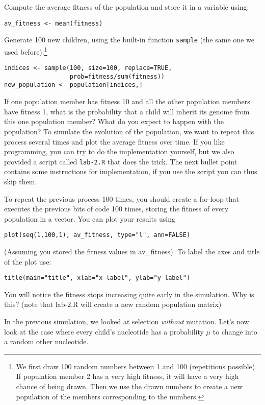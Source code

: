 \documentclass[a4paper, 9pt]{article}
\begin{document}
\begin{exercise}
    \action Compute the average fitness of the population and store it in a variable using:
\begin{lstlisting}
av_fitness <- mean(fitness)
\end{lstlisting}
    \action Generate 100 new children, using the built-in function \texttt{sample} (the same one we used before):\footnote{We first draw 100 random numbers between 1 and 100 (repetitions possible). If population member 2 has a very high fitness, it will have a very high chance of being drawn. Then we use the drawn numbers to create a new population of the members corresponding to the numbers.}
\begin{lstlisting}
indices <- sample(100, size=100, replace=TRUE, 
                  prob=fitness/sum(fitness))
new_population <- population[indices,]
\end{lstlisting}
    \askstar If one population member has fitness 10 and all the other population members have fitness 1, what is the probability that a child will inherit its genome from this one population member? What do you expect to happen with the population?
    \action To simulate the evolution of the population, we want to repeat this process several times and plot the average fitness over time. If you like programming, you can try to do the implementation yourself, but we also provided a script called \texttt{lab-2.R} that does the trick. The next bullet point contains some instructions for implementation, if you use the script you can thus skip them.

    \action To repeat the previous process 100 times, you should create a for-loop that executes the previous bits of code 100 times, storing the fitness of every population in a vector. You can plot your results using
\begin{lstlisting}
plot(seq(1,100,1), av_fitness, type="l", ann=FALSE)
\end{lstlisting}
    (Assuming you stored the fitness values in av\_fitness).
    To label the axes and title of the plot use:
\begin{lstlisting}
title(main="title", xlab="x label", ylab="y label")
\end{lstlisting}
    \askstar You will notice the fitness stops increasing quite early in the simulation. Why is this? (note that lab-2.R will create a new random population matrix)
\end{exercise}


In the previous simulation, we looked at selection \textit{without}
mutation. Let's now look at the case where every child's nucleotide has
a probability $\mu$ to change into a random other nucleotide.
\end{document}
